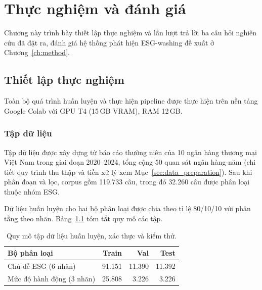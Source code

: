 \chapter{Thực nghiệm và đánh giá}
\label{ch:experiment}

Chương này trình bày thiết lập thực nghiệm và lần lượt trả lời ba câu hỏi nghiên cứu đã đặt ra, đánh giá hệ thống phát hiện ESG-washing đề xuất ở Chương~\ref{ch:method}.




\section{Thiết lập thực nghiệm}
\label{sec:exp_setup}

Toàn bộ quá trình huấn luyện và thực hiện pipeline được thực hiện trên nền tảng Google Colab với GPU T4 (15\,GB VRAM), RAM 12\,GB.

\subsection{Tập dữ liệu}
\label{subsec:dataset}

Tập dữ liệu được xây dựng từ báo cáo thường niên của 10 ngân hàng thương mại Việt Nam trong giai đoạn 2020--2024, tổng cộng 50 quan sát ngân hàng-năm (chi tiết quy trình thu thập và tiền xử lý xem Mục~\ref{sec:data_preparation}). Sau khi phân đoạn và lọc, corpus gồm 119.733 câu, trong đó 32.260 câu được phân loại thuộc nhóm ESG.

Dữ liệu huấn luyện cho hai bộ phân loại được chia theo tỉ lệ 80/10/10 với phân tầng theo nhãn. Bảng~\ref{tab:data_split} tóm tắt quy mô các tập.

\begin{table}[H]
\centering
\caption{Quy mô tập dữ liệu huấn luyện, xác thực và kiểm thử.}
\label{tab:data_split}
\begin{tabular}{lrrr}
\toprule
\textbf{Bộ phân loại} & \textbf{Train} & \textbf{Val} & \textbf{Test} \\
\midrule
Chủ đề ESG (6 nhãn)        & 91.151 & 11.390 & 11.392 \\
Mức độ hành động (3 nhãn)   & 25.808 &  3.226 &  3.226 \\
\bottomrule
\end{tabular}
\end{table}

